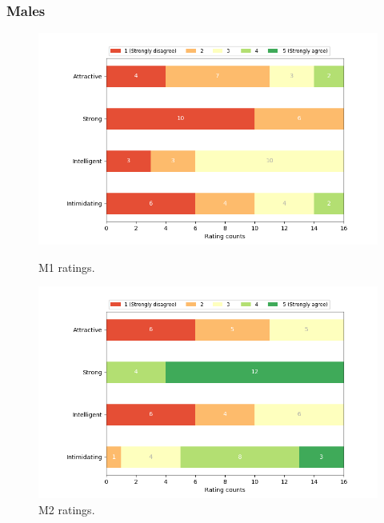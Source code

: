 \subsubsection{Males}
\begin{figure}[H]
  \includegraphics[width=\linewidth]{Survey/MRatings/avatar_m1.png}
  \caption{M1 ratings.}
\endminipage\hfill
{}
  \includegraphics[width=\linewidth]{Survey/MRatings/avatar_m2.png}
  \caption{M2 ratings.}
\endminipage\hfill
\end{figure}
